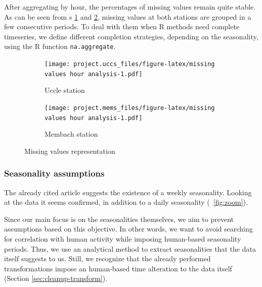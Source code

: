 \documentclass[12pt]{article}
\begin{document}
After aggregating by hour, the percentages of missing values remain quite stable. As can be seen from \figurename{s} \ref{missing-values-seconds:uccs} and \ref{missing-values-seconds:mems}, missing values at both stations are grouped in a few consecutive periods.
To deal with them when R methods need complete timeseries, we define different completion strategies, depending on the seasonality, using the R function \texttt{na.aggregate}.

\begin{figure}[t]
	\begin{subfigure}{.5\linewidth}
		\texttt{[image: project.uccs\_files/figure-latex/missing values hour analysis-1.pdf]}
		\caption{Uccle station}
		\label{missing-values-seconds:uccs}
	\end{subfigure}
	\begin{subfigure}{.5\linewidth}
		\texttt{[image: project.mems\_files/figure-latex/missing values hour analysis-1.pdf]}
		\caption{Membach station}
		\label{missing-values-seconds:mems}
	\end{subfigure}
	\caption{Missing values representation}
	\label{missing-values-seconds}
\end{figure}
%
\subsubsection{Seasonality assumptions}
The already cited article \cite{NatureCoronavirusSeismic} suggests the existence of a weekly seasonality. Looking at the data it seems confirmed, in addition to a daily seasonality (\figurename~\ref{fig:zoom}).

Since our main focus is on the seasonalities themselves, we aim to prevent assumptions based on this objective. In other words, we want to avoid searching for correlation with human activity while imposing human-based seasonality periods. Thus, we use an analytical method to extract seasonalities that the data itself suggests to us. Still, we recognize that the already performed transformations impose an human-based time alteration to the data itself (Section \ref{sec:cleanup-transform}).
\end{document}
